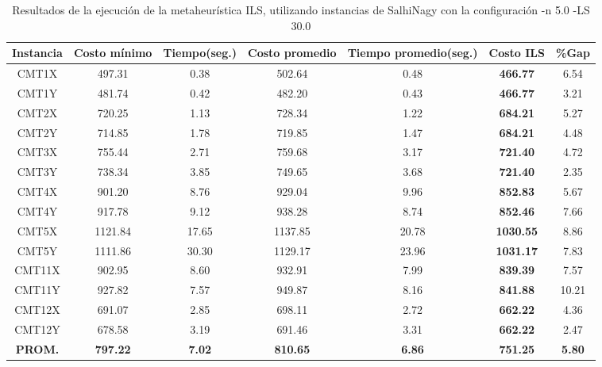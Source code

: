 \begin{table}[ht]
\caption{Resultados de la ejecución de la metaheurística ILS, utilizando instancias de SalhiNagy con la configuración -n 5.0 -LS 30.0}
\centering
\small
\begin{tabular}{c c c c c c c}
\hline\hline
Instancia & Costo mínimo & Tiempo(seg.) & Costo promedio & Tiempo promedio(seg.) & Costo ILS & \%Gap \\ [0.5ex]
\hline
CMT1X & 497.31 & 0.38 & 
502.64 & 0.48 & \bf{466.77} & 
6.54\\CMT1Y & 481.74 & 0.42 & 
482.20 & 0.43 & \bf{466.77} & 
3.21\\CMT2X & 720.25 & 1.13 & 
728.34 & 1.22 & \bf{684.21} & 
5.27\\CMT2Y & 714.85 & 1.78 & 
719.85 & 1.47 & \bf{684.21} & 
4.48\\CMT3X & 755.44 & 2.71 & 
759.68 & 3.17 & \bf{721.40} & 
4.72\\CMT3Y & 738.34 & 3.85 & 
749.65 & 3.68 & \bf{721.40} & 
2.35\\CMT4X & 901.20 & 8.76 & 
929.04 & 9.96 & \bf{852.83} & 
5.67\\CMT4Y & 917.78 & 9.12 & 
938.28 & 8.74 & \bf{852.46} & 
7.66\\CMT5X & 1121.84 & 17.65 & 
1137.85 & 20.78 & \bf{1030.55} & 
8.86\\CMT5Y & 1111.86 & 30.30 & 
1129.17 & 23.96 & \bf{1031.17} & 
7.83\\CMT11X & 902.95 & 8.60 & 
932.91 & 7.99 & \bf{839.39} & 
7.57\\CMT11Y & 927.82 & 7.57 & 
949.87 & 8.16 & \bf{841.88} & 
10.21\\CMT12X & 691.07 & 2.85 & 
698.11 & 2.72 & \bf{662.22} & 
4.36\\CMT12Y & 678.58 & 3.19 & 
691.46 & 3.31 & \bf{662.22} & 
2.47\\\bf{PROM.} & 
\bf{797.22} & \bf{7.02} & \bf{810.65} & \bf{6.86} & \bf{751.25} & \bf{5.80}\\[1ex]\hline
\end{tabular}
\label{table:nonlin}
\end{table} \clearpage
